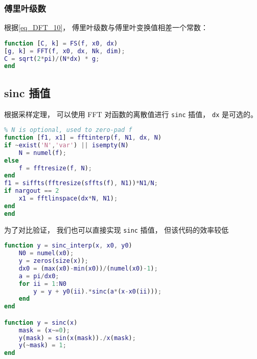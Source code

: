 \subsubsection{傅里叶级数}
根据\autoref{eq_DFT_10}， 傅里叶级数与傅里叶变换值相差一个常数：
\begin{lstlisting}[language=matlab, caption=FS.m]
% Fourier series by FFT
function [C, k] = FS(f, x0, dx)
[g, k] = FFT(f, x0, dx, Nk, dim);
C = sqrt(2*pi)/(N*dx) * g;
end
\end{lstlisting}

\subsection{sinc 插值}
根据采样定理， 可以使用 FFT 对函数的离散值进行 \verb|sinc| 插值， \verb|dx| 是可选的。
\begin{lstlisting}[language=matlab, caption=fftinterp.m]
% approximate sinc interpolation by fft
% N is optional, used to zero-pad f
function [f1, x1] = fftinterp(f, N1, dx, N)
if ~exist('N','var') || isempty(N)
    N = numel(f);
else
    f = fftresize(f, N);
end
f1 = siffts(fftresize(sffts(f), N1))*N1/N;
if nargout == 2
    x1 = fftlinspace(dx*N, N1);
end
end
\end{lstlisting}

为了对比验证， 我们也可以直接实现 \verb|sinc| 插值， 但该代码的效率较低
\begin{lstlisting}[language=matlab, caption=sinc\_interp.m]
% sinc_interp
function y = sinc_interp(x, x0, y0)
    N0 = numel(x0);
    y = zeros(size(x));
    dx0 = (max(x0)-min(x0))/(numel(x0)-1);
    a = pi/dx0;
    for ii = 1:N0
        y = y + y0(ii).*sinc(a*(x-x0(ii)));
    end
end

function y = sinc(x)
    mask = (x~=0);
    y(mask) = sin(x(mask))./x(mask);
    y(~mask) = 1;
end
\end{lstlisting}
